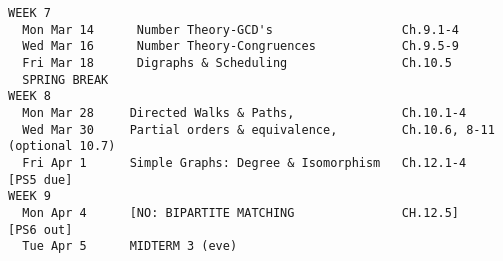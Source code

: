 \documentclass[quiz]{mcs}
\begin{document}

\begin{verbatim}
WEEK 7
  Mon Mar 14      Number Theory-GCD's                  Ch.9.1-4    
  Wed Mar 16      Number Theory-Congruences            Ch.9.5-9  
  Fri Mar 18      Digraphs & Scheduling                Ch.10.5
  SPRING BREAK
WEEK 8
  Mon Mar 28     Directed Walks & Paths,               Ch.10.1-4
  Wed Mar 30     Partial orders & equivalence,         Ch.10.6, 8-11 (optional 10.7)
  Fri Apr 1      Simple Graphs: Degree & Isomorphism   Ch.12.1-4        [PS5 due]
WEEK 9
  Mon Apr 4      [NO: BIPARTITE MATCHING               CH.12.5]         [PS6 out]
  Tue Apr 5      MIDTERM 3 (eve) 
\end{verbatim}


\end{document}
